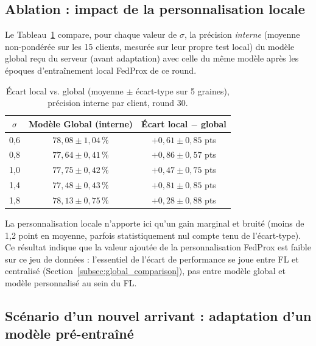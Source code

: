 \documentclass{article}
\begin{document}
\subsection{Ablation : impact de la personnalisation locale}
\label{subsec:ablation_personalization}

Le Tableau~\ref{tab:ablation_b} compare, pour chaque valeur de $\sigma$, la précision
\emph{interne} (moyenne non-pondérée sur les 15 clients, mesurée sur leur propre
test local) du modèle global reçu du serveur (avant adaptation) avec celle du même
modèle après les époques d'entraînement local FedProx de ce round.

\begin{table}[h!]
  \centering
  \caption{Écart local vs. global (moyenne $\pm$ écart-type sur 5 graines), précision
  interne par client, round 30.}
  \label{tab:ablation_b}
  \begin{tabular}{ccc}
    \toprule
    $\sigma$ & Modèle Global (interne) & Écart local $-$ global \\
    \midrule
    0,6 & $78{,}08 \pm 1{,}04\,\%$ & $+0{,}61 \pm 0{,}85$ pts \\
    0,8 & $77{,}64 \pm 0{,}41\,\%$ & $+0{,}86 \pm 0{,}57$ pts \\
    1,0 & $77{,}75 \pm 0{,}42\,\%$ & $+0{,}47 \pm 0{,}75$ pts \\
    1,4 & $77{,}48 \pm 0{,}43\,\%$ & $+0{,}81 \pm 0{,}85$ pts \\
    1,8 & $78{,}13 \pm 0{,}75\,\%$ & $+0{,}28 \pm 0{,}88$ pts \\
    \bottomrule
  \end{tabular}
\end{table}

La personnalisation locale n'apporte ici qu'un gain marginal et bruité (moins de 1,2
point en moyenne, parfois statistiquement nul compte tenu de l'écart-type). Ce
résultat indique que la valeur ajoutée de la personnalisation FedProx est faible sur
ce jeu de données : l'essentiel de l'écart de performance se joue entre FL et
centralisé (Section~\ref{subsec:global_comparison}), pas entre modèle global et
modèle personnalisé au sein du FL.

\subsection{Scénario d'un nouvel arrivant : adaptation d'un modèle pré-entraîné}
\label{subsec:late_joiner}
\end{document}
